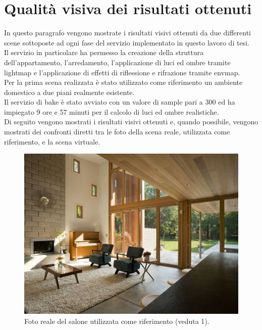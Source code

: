 \section{Qualità visiva dei risultati ottenuti}
\label{sec:chapter_prove_sperimentali_qualita_visiva}

In questo paragrafo vengono mostrate i risultati visivi ottenuti da due differenti scene sottoposte ad ogni fase del servizio implementato in questo lavoro di tesi.
\\ 
Il servizio in particolare ha permesso la creazione della struttura dell’appartamento, l’arredamento, l’applicazione di luci ed ombre tramite lightmap e l’applicazione di effetti di riflessione e rifrazione tramite envmap.
\\
Per la prima scena realizzata è stato utilizzato come riferimento un ambiente domestico a due piani realmente esistente.
\\
Il servizio di bake  è stato avviato con un valore di sample pari a 300 ed ha impiegato 9 ore e 57 minuti per il calcolo di luci ed ombre realistiche.
\\
Di seguito vengono mostrati i risultati visivi ottenuti e, quando possibile, vengono mostrati dei confronti diretti tra le foto della scena reale, utilizzata come riferimento, e la scena virtuale.
\\
\begin{figure}[htb]
 \centering
 \includegraphics[width=1\linewidth]{images/chapter_prove_sperimentali/scena1_reale.jpg}\hfill
 \caption[Ambiente reale: Salone, veduta 1]{Foto reale del salone utilizzata come riferimento (veduta 1).}
 \label{fig:prove_sperimentali_qualita_visiva_scena1_reale}
\end{figure}

